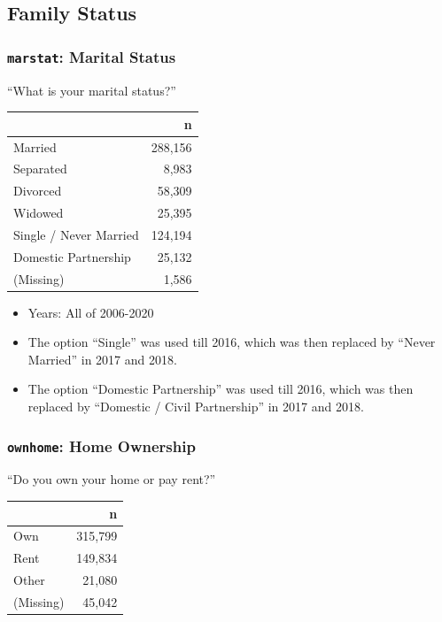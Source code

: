 \documentclass[10pt,article,oneside]{memoir}
\theoremstyle{definition}
\begin{document}
\hypertarget{family-status}{%
\subsection{Family Status}\label{family-status}}

\hypertarget{marstat-marital-status}{%
\subsubsection{\texorpdfstring{\texttt{marstat}: Marital
Status}{marstat: Marital Status}}\label{marstat-marital-status}}

``What is your marital status?''

\begin{table}[H]
\centering
\begin{tabular}{lr}
\toprule
 & n\\
\midrule
Married & 288,156\\
Separated & 8,983\\
Divorced & 58,309\\
Widowed & 25,395\\
Single / Never Married & 124,194\\
Domestic Partnership & 25,132\\
(Missing) & 1,586\\
\bottomrule
\end{tabular}
\end{table}

\begin{itemize}
\tightlist
\item
  Years: All of 2006-2020
\item
  The option ``Single'' was used till 2016, which was then replaced by
  ``Never Married'' in 2017 and 2018.
\item
  The option ``Domestic Partnership'' was used till 2016, which was then
  replaced by ``Domestic / Civil Partnership'' in 2017 and 2018.
\end{itemize}

\hypertarget{ownhome-home-ownership}{%
\subsubsection{\texorpdfstring{\texttt{ownhome}: Home
Ownership}{ownhome: Home Ownership}}\label{ownhome-home-ownership}}

``Do you own your home or pay rent?''

\begin{table}[H]
\centering
\begin{tabular}{lr}
\toprule
 & n\\
\midrule
Own & 315,799\\
Rent & 149,834\\
Other & 21,080\\
(Missing) & 45,042\\
\bottomrule
\end{tabular}
\end{table}
\end{document}
